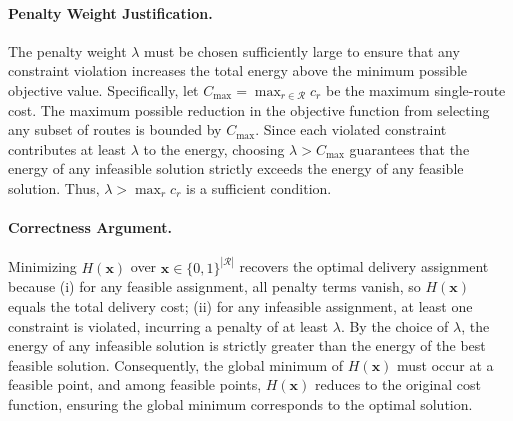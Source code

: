 \documentclass[12pt]{article}
\begin{document}
\paragraph{Penalty Weight Justification.}
The penalty weight $\lambda$ must be chosen sufficiently large to ensure that any constraint violation increases the total energy above the minimum possible objective value. Specifically, let $C_{\max} = \max_{r \in \mathcal{R}} c_r$ be the maximum single-route cost. The maximum possible reduction in the objective function from selecting any subset of routes is bounded by $C_{\max}$. Since each violated constraint contributes at least $\lambda$ to the energy, choosing $\lambda > C_{\max}$ guarantees that the energy of any infeasible solution strictly exceeds the energy of any feasible solution. Thus, $\lambda > \max_{r} c_r$ is a sufficient condition.

\paragraph{Correctness Argument.}
Minimizing $H(\mathbf{x})$ over $\mathbf{x} \in \{0,1\}^{|\mathcal{R}|}$ recovers the optimal delivery assignment because (i) for any feasible assignment, all penalty terms vanish, so $H(\mathbf{x})$ equals the total delivery cost; (ii) for any infeasible assignment, at least one constraint is violated, incurring a penalty of at least $\lambda$. By the choice of $\lambda$, the energy of any infeasible solution is strictly greater than the energy of the best feasible solution. Consequently, the global minimum of $H(\mathbf{x})$ must occur at a feasible point, and among feasible points, $H(\mathbf{x})$ reduces to the original cost function, ensuring the global minimum corresponds to the optimal solution.
\end{document}
